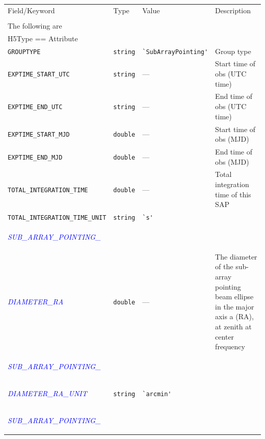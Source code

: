 \documentclass[a4paper,10pt,bibtotoc]{scrartcl}
\begin{document}
\begin{small}
\begin{table}[h]
\begin{small}
  \centering
  \begin{tabular}{|lllp{5.5cm}|}
    \hline
    \sc Field/Keyword  & \sc Type & \sc Value & Description \\
    \sc   & \sc & \sc & \\
    \hline \hline
    \sc The following are & \sc & \sc & \\
    \sc H5Type == Attribute & \sc & \sc & \\
    \hline 
    \verb|GROUPTYPE|   & \verb|string| & \verb|`SubArrayPointing'| & Group type  \\
    \verb|EXPTIME_START_UTC|  & \verb|string| & --- & Start time of obs (UTC time) \\
    \verb|EXPTIME_END_UTC|  & \verb|string| & --- & End time of obs (UTC time) \\
    \verb|EXPTIME_START_MJD|  & \verb|double| & --- & Start time of obs (MJD) \\
    \verb|EXPTIME_END_MJD|  & \verb|double|  & --- & End time of obs (MJD) \\
    \verb|TOTAL_INTEGRATION_TIME| & \verb|double| & --- & Total integration time of this SAP \\
    \verb|TOTAL_INTEGRATION_TIME_UNIT| & \verb|string| & \verb|`s'| & \\
    \begin{scriptsize}\textcolor{blue}{\textit{SUB\_ARRAY\_POINTING\_}}\end{scriptsize} &  &  & \\
    \begin{scriptsize}\textcolor{blue}{\textit{ DIAMETER\_RA}}\end{scriptsize} & \verb|double| & --- & The diameter of the sub-array pointing beam ellipse in the major axis a (RA), at zenith at center frequency \\
    \begin{scriptsize}\textcolor{blue}{\textit{SUB\_ARRAY\_POINTING\_}}\end{scriptsize}  &  &  & \\
    \begin{scriptsize}\textcolor{blue}{\textit{ DIAMETER\_RA\_UNIT}}\end{scriptsize}  & \verb|string| & \verb|`arcmin'| & \\
    \begin{scriptsize}\textcolor{blue}{\textit{SUB\_ARRAY\_POINTING\_}}\end{scriptsize} &  &  & \\

\end{tabular}
\end{small}
\end{table}
\end{small}
\end{document}
